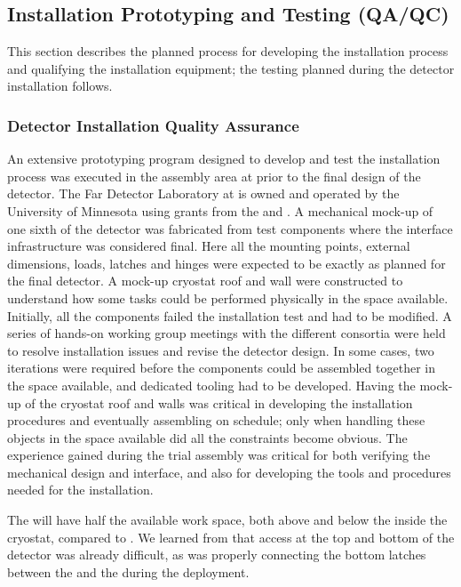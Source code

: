 \subsection{Installation Prototyping and Testing (QA/QC)}
\label{sec:fdsp-tc-inst-qaqc}

This section describes the planned  process for developing the installation process and qualifying the installation equipment; the  testing planned during the detector installation follows. 

\subsubsection{Detector Installation Quality Assurance}

An extensive prototyping program designed to develop and test the  installation process was executed in the  assembly area at  prior to the final design of the  detector. 
The  Far Detector Laboratory at  is owned and operated by the University of Minnesota using grants from the  and .
A mechanical mock-up of one sixth of the detector was fabricated from test components where the interface infrastructure was considered final. 
Here all the mounting points, external dimensions, loads, latches and hinges were expected to be exactly as planned for the final  detector.
A mock-up cryostat roof and wall were constructed to understand how some tasks could  be performed physically in the space available.
Initially, all the components failed the installation test and had to be modified. A series of hands-on working group meetings with the different consortia were held to resolve installation issues and revise the detector design. 
In some cases, two iterations were required before the components could be assembled together in the space available, and dedicated tooling had to be developed. 
Having the mock-up of the cryostat roof and walls was critical in developing the installation procedures and eventually assembling  on schedule; only when handling these objects in the space available did all the constraints become obvious. 
The experience gained during the    trial assembly was critical for both verifying the mechanical design and interface, and also for developing the tools and procedures needed for the installation.

The   will have half the available work space,  both above and below the  inside the cryostat, compared to . 
We learned from  that access at the top and bottom of the detector was already 
difficult, as was %
properly connecting the bottom latches between the  and the  during the  deployment. %


